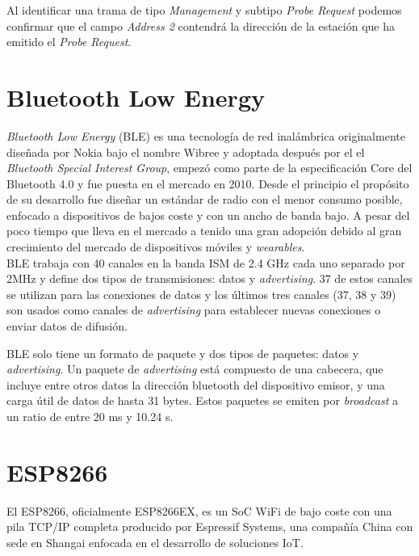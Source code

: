 \documentclass[../proyecto.tex]{subfiles}
\begin{document}
Al identificar una trama de tipo \textit{Management} y subtipo \textit{Probe Request} podemos confirmar que el campo \textit{Address 2} contendrá la dirección de la estación que ha emitido el \textit{Probe Request}.

\section{Bluetooth Low Energy}

\textit{Bluetooth Low Energy} (BLE) es una tecnología de red inalámbrica originalmente diseñada por Nokia bajo el nombre Wibree y adoptada después por el  el \textit{Bluetooth Special Interest Group}, empezó como parte de la especificación Core del Bluetooth 4.0 y fue puesta en el mercado en 2010. Desde el principio el propósito de su desarrollo fue diseñar un estándar de radio con el menor consumo posible, enfocado a dispositivos de bajos coste y con un ancho de banda bajo. A pesar del poco tiempo que lleva en el mercado a tenido una gran adopción debido al gran crecimiento del mercado de dispositivos móviles y \textit{wearables}.\\


BLE trabaja con 40 canales en la banda ISM de 2.4 GHz cada uno separado por 2MHz y define dos tipos de transmisiones: datos y \textit{advertising}. 37 de estos canales se utilizan para las conexiones de datos y los últimos tres canales (37, 38 y 39) son usados como canales de \textit{advertising} para establecer nuevas conexiones o enviar datos de difusión.


BLE solo tiene un formato de paquete y dos tipos de paquetes: datos y \textit{advertising}. Un paquete de \textit{advertising} está compuesto de una cabecera, que incluye entre otros datos la dirección bluetooth del dispositivo emisor, y una carga útil de datos de hasta 31 bytes. Estos paquetes se emiten por \textit{broadcast} a un ratio de entre 20 ms y 10.24 s.




\section{ESP8266}

El ESP8266, oficialmente ESP8266EX, es un SoC WiFi de bajo coste con una pila TCP/IP completa producido por Espressif Systems, una compañía China con sede en Shangai enfocada en el desarrollo de soluciones IoT. \cite{esp8266_overview} \\
\end{document}
